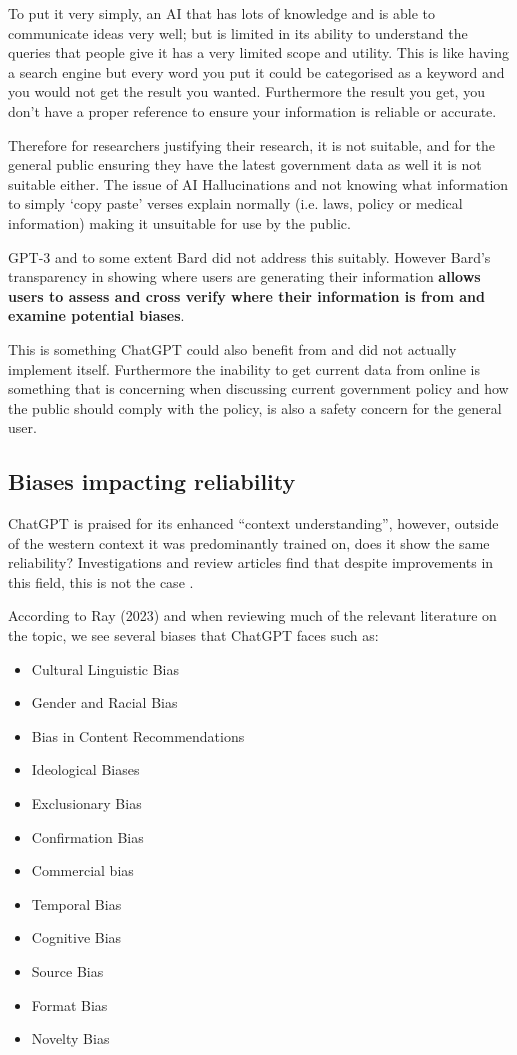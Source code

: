 To put it very simply, an AI that has lots of knowledge and is able to communicate ideas very well; but is limited in its ability to understand the queries that people give it has a very limited scope and utility. This is like having a search engine but every word you put it could be categorised as a keyword and you would not get the result you wanted. Furthermore the result you get, you don’t have a proper reference to ensure your information is reliable or accurate.

Therefore for researchers justifying their research, it is not suitable, and for the general public ensuring they have the latest government data as well it is not suitable either. The issue of AI Hallucinations and not knowing what information to simply ‘copy paste’ verses explain normally (i.e. laws, policy or medical information) making it unsuitable for use by the public.

GPT-3 and to some extent Bard did not address this suitably. However Bard’s transparency in showing where users are generating their information \textbf{allows users to assess and cross verify where their information is from and examine potential biases}.

This is something ChatGPT could also benefit from and did not actually implement itself. Furthermore the inability to get current data from online is something that is concerning when discussing current government policy and how the public should comply with the policy, is also a safety concern for the general user.

\subsection{Biases impacting reliability}

ChatGPT is praised for its enhanced “context understanding”, however, outside of the western context it was predominantly trained on, does it show the same reliability? Investigations and review articles find that despite improvements in this field, this is not the case \cite{Ray2023}. 

According to Ray (2023) and when reviewing much of the relevant literature on the topic, we see several biases that ChatGPT faces such as:
\begin{itemize}
\item Cultural Linguistic Bias
\item Gender and Racial Bias
\item Bias in Content Recommendations
\item Ideological Biases
\item Exclusionary Bias
\item Confirmation Bias
\item Commercial bias
\item Temporal Bias
\item Cognitive Bias
\item Source Bias
\item Format Bias
\item Novelty Bias
\end{itemize}

